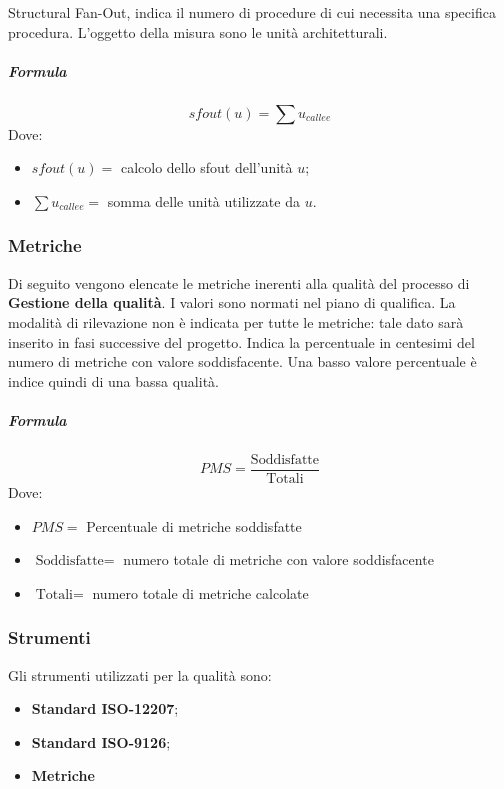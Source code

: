         Structural Fan-Out, indica il numero di procedure di cui necessita una 
        specifica procedura. L'oggetto della misura sono le unità architetturali. 
        \subparagraph{Formula}
        \begin{displaymath}
          sfout(u) = \sum u_{callee}
        \end{displaymath}
        Dove:
        \begin{itemize}
          \item[] $sfout(u) =$ calcolo dello sfout dell'unità $u$;
          \item[] $\sum u_{callee} =$ somma delle unità utilizzate da $u$.
        \end{itemize}
		
		\subsubsection{Metriche}
		Di seguito vengono elencate le metriche inerenti alla qualità del processo di \textbf{Gestione della qualità}. I valori sono normati nel piano di qualifica. La modalità di rilevazione non è indicata per tutte le metriche: tale dato sarà 
        inserito in fasi successive del progetto.
        Indica la percentuale in centesimi del numero di metriche con valore soddisfacente. Una basso valore percentuale è indice quindi di una bassa qualità.
        \subparagraph{Formula}
        \begin{displaymath}
          PMS = \frac{\textrm{Soddisfatte}}{\textrm{Totali}}
        \end{displaymath}
        Dove:
        \begin{itemize}
        \item[] $PMS =$ Percentuale di metriche soddisfatte
        \item[] $\textrm{Soddisfatte} =$ numero totale di metriche con valore soddisfacente
        \item[] $\textrm{Totali} =$ numero totale di metriche calcolate
        \end{itemize}
    \subsubsection{Strumenti}
		Gli strumenti utilizzati per la qualità sono:
		\begin{itemize}
			\item \textbf{Standard ISO-12207};
			\item \textbf{Standard ISO-9126};
			\item \textbf{Metriche}
		\end{itemize}
	
